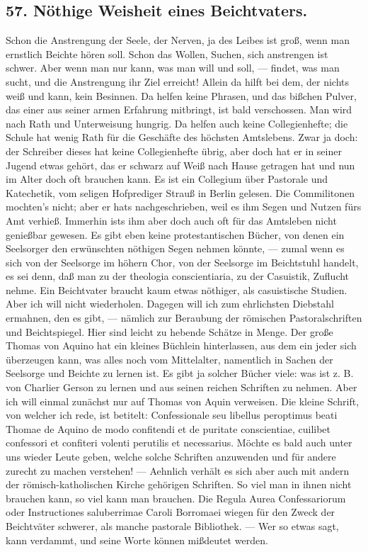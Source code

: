 \subsection*{57. Nöthige Weisheit eines Beichtvaters.}

Schon die Anstrengung der Seele, der Nerven, ja des Leibes ist groß, wenn man ernstlich Beichte hören soll. Schon das Wollen, Suchen, sich anstrengen ist schwer. Aber wenn man nur kann, was man will und soll, — findet, was man sucht, und die Anstrengung ihr Ziel erreicht! Allein da hilft bei dem, der nichts weiß und kann, kein Besinnen. Da helfen keine Phrasen, und das bißchen Pulver, das einer aus seiner armen Erfahrung mitbringt, ist bald verschossen. Man wird nach Rath und Unterweisung hungrig. Da helfen auch keine Collegienhefte; die Schule hat wenig Rath für die Geschäfte des höchsten Amtslebens. Zwar ja doch: der Schreiber dieses hat keine Collegienhefte übrig, aber doch hat er in seiner Jugend etwas gehört, das er schwarz auf Weiß nach Hause getragen hat und nun im Alter doch oft brauchen kann. Es ist ein Collegium über Pastorale und Katechetik, vom seligen Hofprediger Strauß in Berlin gelesen. Die Commilitonen mochten's nicht; aber er hats nachgeschrieben, weil es ihm Segen und Nutzen fürs Amt verhieß. Immerhin ists ihm aber doch auch oft für das Amtsleben nicht genießbar gewesen. Es gibt eben keine protestantischen Bücher, von denen ein Seelsorger den erwünschten nöthigen Segen nehmen könnte, —
zumal wenn es sich von der Seelsorge im höhern Chor, von der Seelsorge im Beichtstuhl handelt, es sei denn, daß man zu der theologia conscientiaria, zu der Casuistik, Zuflucht nehme. Ein Beichtvater braucht kaum etwas nöthiger, als casuistische Studien. Aber ich will nicht wiederholen. Dagegen will ich zum ehrlichsten Diebstahl ermahnen, den es gibt, — nämlich zur Beraubung der römischen Pastoralschriften und Beichtspiegel. Hier sind leicht zu hebende Schätze in Menge. Der große Thomas von Aquino hat ein kleines Büchlein hinterlassen, aus dem ein jeder sich überzeugen kann, was alles noch vom Mittelalter, namentlich in Sachen der Seelsorge und Beichte zu lernen ist. Es gibt ja solcher Bücher viele: was ist z. B. von Charlier Gerson zu lernen und aus seinen reichen Schriften zu nehmen. Aber ich will einmal zunächst nur auf Thomas von Aquin verweisen. Die kleine Schrift, von welcher ich rede, ist betitelt: Confessionale seu libellus peroptimus beati Thomae de Aquino de modo confitendi et de puritate conscientiae, cuilibet confessori et confiteri volenti perutilis et necessarius. Möchte es bald auch unter uns wieder Leute geben, welche solche Schriften anzuwenden und für andere zurecht zu machen verstehen! — Aehnlich verhält es sich aber auch mit andern der römisch-katholischen Kirche gehörigen Schriften. So viel man in ihnen nicht brauchen kann, so viel kann man brauchen. Die Regula Aurea Confessariorum oder Instructiones saluberrimae Caroli Borromaei wiegen für den Zweck der Beichtväter schwerer, als manche pastorale Bibliothek. — Wer so etwas sagt, kann verdammt, und seine Worte können mißdeutet werden.

